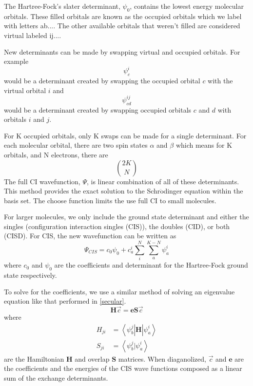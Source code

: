 	The Hartree-Fock's slater determinant, \(\psi_0\), contains the lowest energy molecular orbitals.
	These filled orbitals are known as the occupied orbitals which we label with letters ab....
	The other available orbitals that weren't filled are considered virtual labeled ij....

	New determinants can be made by swapping virtual and occupied orbitals.
	For example
	\begin{equation}
	  \psi_c^i
	\end{equation}
	would be a determinant created by swapping the occupied orbital \(c\) with the virtual orbital \(i\) and
	\begin{equation}
	  \psi_{cd}^{ij}
	\end{equation}
	would be a determinant created by swapping occupied orbitals \(c\) and \(d\) with orbitals \(i\) and \(j\).

	For K occupied orbitals, only K swaps can be made for a single determinant.
	For each molecular orbital, there are two spin states \(\alpha\) and \(\beta\) which means for K orbitals, and N electrons, there are
	\begin{equation}
	  2K \choose N
	\end{equation}
	The full CI wavefunction, \(\Psi\), is linear combination of all of these determinants.
This method provides the exact solution to the Schr\(\ddot{\text{o}}\)dinger equation within the basis set.
	The choose function limits the use full CI to small molecules.

	For larger molecules, we only include the ground state determinant and either the singles (configuration interaction singles (CIS)), the doubles (CID), or both (CISD).
	For CIS, the new wavefunction can be written as
	\begin{equation}
	\Psi_{CIS} = c_0\psi_0 + c_a^i\sum_i^N\sum_a^{K-N}\psi_a^i
	\end{equation}
	where \(c_0\) and \(\psi_0\) are the coefficients and determinant for the Hartree-Fock ground state respectively.

	To solve for the coefficients, we use a similar method of solving an eigenvalue equation like that performed in \ref{secular}.
	\begin{equation}\label{eq:CIS}
	  \bm{H}\vec{c} = \bm{e} \bm{S} \vec{c}
	\end{equation}
	where
	\begin{align}
	  H_{ji} &= \left<\psi_b^j \right| \bm{H} \left| \psi_a^i \right> \label{eq:CISMatrix}\\
	  S_{ji} &= \left<\psi_b^j | \psi_a^i \right>
	\end{align}
	are the Hamiltonian \(\bm{H}\) and overlap \(\bm{S}\) matrices.
	When diaganolized, \(\vec{c}\) and \(\bm{e}\) are the coefficients and the energies of the CIS wave functions composed as a linear sum of the exchange determinants.

